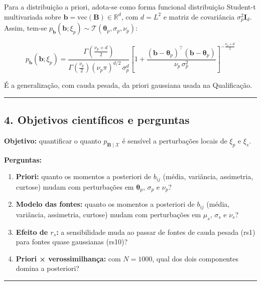 \documentclass[11pt]{article}
\providecommand{\tightlist}{%
      \setlength{\itemsep}{0pt}\setlength{\parskip}{0pt}}
\begin{document}
Para a distribuição a priori, adota-se como forma funcional distribuição
Student-t multivariada sobre
\(\mathbf b = \mathrm{vec}(\mathbf B) \in \mathbb R^{d}\), com
\(d = L^2\) e matriz de covariância \(\sigma_p^2\mathbf I_d\). Assim,
tem-se
\(p_{\mathbf b}(\mathbf b;\xi_p) \sim \mathcal{T}(\boldsymbol\theta_p,\sigma_p,\nu_p)\):

\[p_{\mathbf b}(\mathbf b;\xi_p) = \frac{\Gamma\!\left(\frac{\nu_p+d}{2}\right)}{\Gamma\!\left(\frac{\nu_p}{2}\right)(\nu_p\pi)^{d/2}\,\sigma_p^{d}}\left[1 + \frac{(\mathbf b-\boldsymbol\theta_p)^\top(\mathbf b-\boldsymbol\theta_p)}{\nu_p\,\sigma_p^{2}}\right]^{-\frac{\nu_p+d}{2}}\]

É a generalização, com cauda pesada, da priori gaussiana usada na
Qualificação.

\begin{center}\rule{0.5\linewidth}{0.5pt}\end{center}

\subsection{4. Objetivos científicos e
perguntas}\label{objetivos-cientuxedficos-e-perguntas}

\textbf{Objetivo:} quantificar o quanto \(p_{\mathbf B\mid\mathcal X}\)
é sensível a perturbações locais de \(\xi_p\) e \(\xi_s\).

\textbf{Perguntas:}

\begin{enumerate}
\def\labelenumi{\arabic{enumi}.}
\tightlist
\item
  \textbf{Priori:} quanto os momentos a posteriori de \(b_{ij}\) (média,
  variância, assimetria, curtose) mudam com perturbações em
  \(\boldsymbol\theta_p\), \(\sigma_p\) e \(\nu_p\)?
\item
  \textbf{Modelo das fontes:} quanto os momentos a posteriori de
  \(b_{ij}\) (média, variância, assimetria, curtose) mudam com
  perturbações em \(\mu_s\), \(\sigma_s\) e \(\nu_s\)?
\item
  \textbf{Efeito de \(r_s\):} a sensibilidade muda ao passar de fontes
  de cauda pesada (rs1) para fontes quase gaussianas (rs10)?
\item
  \textbf{Priori × verossimilhança:} com \(N = 1000\), qual dos dois
  componentes domina a posteriori?
\end{enumerate}

\begin{center}\rule{0.5\linewidth}{0.5pt}\end{center}
\end{document}
